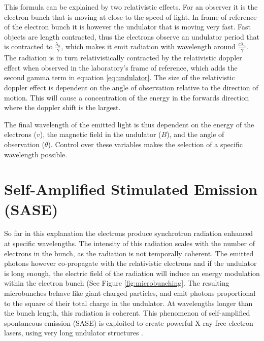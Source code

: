 This formula can be explained by two relativistic effects. For an observer it is the electron bunch that is moving at close to the speed of light. In frame of reference of the electron bunch it is however the undulator that is moving very fast. Fast objects are length contracted, thus the electrons observe an undulator period that is contracted to  $\frac{\lambda_u}{\gamma}$, which makes it emit radiation with wavelength around $\frac{c\lambda_u}{\gamma}$. The radiation is in turn relativistically contracted by the relativistic doppler effect when observed in the laboratory's frame of reference, which adds the second gamma term in equation \ref{eq:undulator}. The size of the relativistic doppler effect is dependent on the angle of observation relative to the direction of motion. This will cause a concentration of the energy in the forwards direction where the doppler shift is the largest.

The final wavelength of the emitted light is thus dependent on the energy of the electrons ($v$), the magnetic field in the undulator ($B$), and the angle of observation ($\theta$). Control over these variables makes the selection of a specific wavelength possible. 

\section{Self-Amplified Stimulated Emission (SASE)}
So far in this explanation the electrons produce synchrotron radiation enhanced at specific wavelengths. The intensity of this radiation scales with the number of electrons in the bunch, as the radiation is not temporally coherent. The emitted photons however co-propagate with the relativistic electrons and if the undulator is long enough, the electric field of the radiation will induce an energy modulation within the electron bunch (See Figure \ref{fig:microbunching}. The resulting microbunches behave like giant charged particles, and emit photons proportional to the square of their total charge in the undulator. At wavelengths longer than the bunch length, this radiation is coherent. This phenomenon of self-amplified spontaneous emission (SASE) is exploited to create powerful X-ray free-electron lasers, using very long undulator structures \cite{Kondratenko1980, Bonifacio1984}. 

